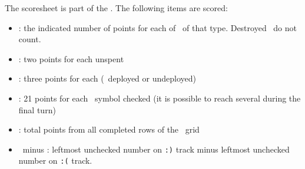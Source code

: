 The scoresheet is part of the \planetsheet.  The following items are scored:
\begin{itemize}
  \item \fortifications: the indicated number of points for each of \fortification\ of that type. Destroyed \fortifications\ do not count.
  \item \currency: two points for each unspent \currency
  \item \squadrons: three points for each (\squadron\ deployed or undeployed)
  \item \mastery: 21 points for each \masterysymbol\ symbol checked (it is possible to reach several during the final turn)
  \item \culture: total points from all completed rows of the \culture\ grid
  \item \happiness\ minus \unhappiness: leftmost unchecked number on \texttt{:)} track minus leftmost unchecked number on \texttt{:(} track.
\end{itemize}
